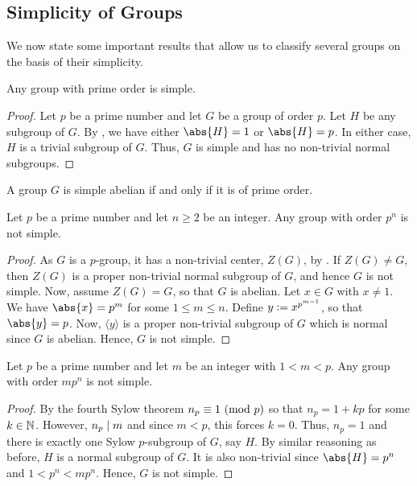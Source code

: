 \subsection{Simplicity of Groups}

We now state some important results that allow us to classify several groups on the basis of their simplicity.

\begin{theorem} \label{thm:simple-order-p}
    Any group with prime order is simple.
\end{theorem}
\begin{proof} 
    Let $p$ be a prime number and let $G$ be a group of order $p$. Let $H$ be any subgroup of $G$. By , we have either $\abs{H} = 1$ or $\abs{H} = p$. In either case, $H$ is a trivial subgroup of $G$. Thus, $G$ is simple and has no non-trivial normal subgroups.
\end{proof}

\begin{prop}
    A group $G$ is simple abelian if and only if it is of prime order.
\end{prop}

\begin{theorem} \label{thm:simple-order-pn}
    Let $p$ be a prime number and let $n \geq 2$ be an integer. Any group with order $p^n$ is not simple.
\end{theorem}
\begin{proof}
    As $G$ is a $p$-group, it has a non-trivial center, $Z(G)$, by . If $Z(G) \neq G$, then $Z(G)$ is a proper non-trivial normal subgroup of $G$, and hence $G$ is not simple. Now, assume $Z(G) = G$, so that $G$ is abelian. Let $x \in G$ with $x \neq 1$. We have $\abs{x} = p^m$ for some $1 \leq m \leq n$. Define $y \vcentcolon= x^{p^{m-1}}$, so that $\abs{y} = p$. Now, $\langle y \rangle$ is a proper non-trivial subgroup of $G$ which is normal since $G$ is abelian. Hence, $G$ is not simple.
\end{proof}

\begin{theorem} \label{thm:simple-order-mpn}
    Let $p$ be a prime number and let $m$ be an integer with $1 < m < p$. Any group with order $mp^n$ is not simple.
\end{theorem}
\begin{proof}
    By the fourth Sylow theorem $n_p \equiv 1\ (\mathrm{mod}\ p)$ so that $n_p = 1 + kp$ for some $k \in \mathbb{N}$. However, $n_p \mid m$ and since $m < p$, this forces $k = 0$. Thus, $n_p = 1$ and there is exactly one Sylow $p$-subgroup of $G$, say $H$. By similar reasoning as before, $H$ is a normal subgroup of $G$. It is also non-trivial since $\abs{H} = p^n$ and $1 < p^n < mp^n$. Hence, $G$ is not simple.
\end{proof}

